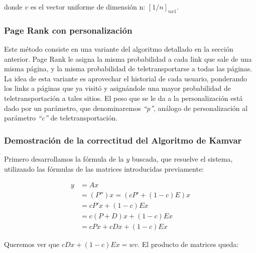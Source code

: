 donde $v$ es el vector uniforme de dimensi\'on n: $[1/n]_{nx1}$.

\subsubsection{Page Rank con personalizaci\'on}
\par Este m\'etodo consiste en una variante del algoritmo detallado en la secci\'on anterior.
Page Rank le asigna la misma probabilidad a cada link que sale de una misma p\'agina, y la misma probabilidad de teletransportarse a todas las p\'aginas.
La idea de esta variante es aprovechar el historial de cada usuario, ponderando los links a p\'aginas que ya visit\'o y asign\'andole una mayor probabilidad
de teletransportaci\'on a tales sitios.
El peso que se le da a la personalizaci\'on est\'a dado por un par\'ametro, que denominaremos \textit{``p''}, an\'alogo de personalizaci\'on al par\'ametro \textit{``c''} de teletransportaci\'on.

\subsubsection{Demostración de la correctitud del Algoritmo de Kamvar}

\par Primero desarrollamos la fórmula de la $y$ buscada, que resuelve el sistema, utilizando las fórmulas de las matrices introducidas previamente:

\begin{align*}
y & = Ax \\ 
& = (P'')x = (cP' + (1-c)E)x \\
& = cP'x + (1-c)Ex \\
& = c(P+D)x + (1-c)Ex \\
& = cPx + cDx + (1-c)Ex 
\end{align*}

\par Queremos ver que $cDx + (1-c)Ex = wv$. El producto de matrices queda:

